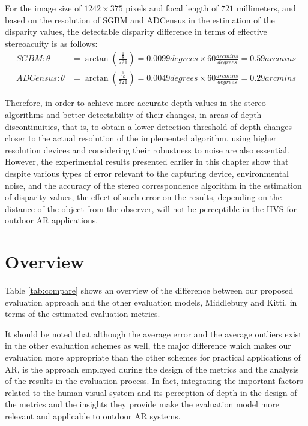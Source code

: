 For the image size of $1242\times375$ pixels and focal length of $721$ millimeters, and based on the resolution of SGBM and ADCensus in the estimation of the disparity values, 
the detectable disparity difference in terms of effective stereoacuity is as follows:
\begin{align}
\label{eq:alg:sgbmresolv} 
SGBM: \theta &= \arctan (\frac{\frac{1}{8}}{721}) = 0.0099 degrees \times 60 \frac{arcmins}{degrees} = 0.59 arcmins \\[2ex]
ADCensus: \theta &= \arctan (\frac{\frac{1}{16}}{721}) = 0.0049 degrees \times 60 \frac{arcmins}{degrees}= 0.29 arcmins \label{eq:adcenresolv}
\end{align}
\noindent

Therefore, in order to achieve more accurate depth values in the stereo algorithms and better detectability of their changes, 
in areas of depth discontinuities, that is, to obtain a lower 
detection threshold of depth changes
closer to the actual resolution of the implemented algorithm, using higher resolution devices and considering their robustness to noise are also essential.
However, the experimental results presented earlier in this chapter
show that despite various types of error relevant to the capturing device, environmental noise, and the accuracy of the stereo correspondence algorithm
in the estimation of disparity values, the effect of such error on the results, depending on the distance of the object from the observer, 
will not be perceptible in the HVS for outdoor AR applications.

\section{Overview}
Table \ref{tab:compare} shows an overview of the difference between our proposed evaluation approach and the other evaluation models, Middlebury
and Kitti, in terms of the estimated evaluation metrics.

It should be noted that although the average error and the average outliers exist in the other evaluation schemes as well, the major
difference which makes our evaluation more appropriate than the other schemes for practical applications of AR,
is the approach employed during the design of the metrics and the analysis of the results in the evaluation process. In fact, integrating the 
important factors related to the human visual system and its
perception of depth in the design of the metrics and the insights they provide make the evaluation model more relevant and applicable to outdoor AR systems.

